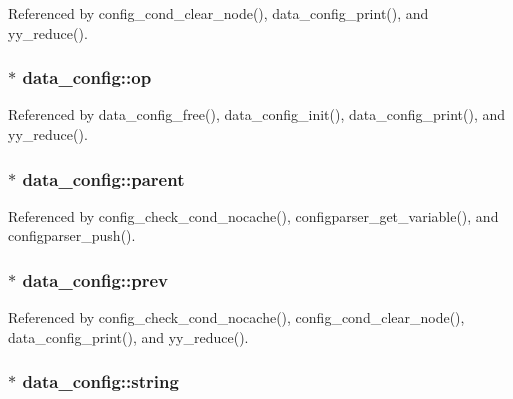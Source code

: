 Referenced by config\-\_\-cond\-\_\-clear\-\_\-node(), data\-\_\-config\-\_\-print(), and yy\-\_\-reduce().

\hypertarget{structdata__config_a16bbe4b9c4da475f530a55cad682508d}{
\subsubsection[{op}]{$\ast$ data\-\_\-config\-::op}}\label{structdata__config_a16bbe4b9c4da475f530a55cad682508d}


Referenced by data\-\_\-config\-\_\-free(), data\-\_\-config\-\_\-init(), data\-\_\-config\-\_\-print(), and yy\-\_\-reduce().

\hypertarget{structdata__config_a673869c2a2837fdde35d7ce85ef2165f}{
\subsubsection[{parent}]{$\ast$ data\-\_\-config\-::parent}}\label{structdata__config_a673869c2a2837fdde35d7ce85ef2165f}


Referenced by config\-\_\-check\-\_\-cond\-\_\-nocache(), configparser\-\_\-get\-\_\-variable(), and configparser\-\_\-push().

\hypertarget{structdata__config_a521a2a5a29d23447ad150324c9705128}{
\subsubsection[{prev}]{$\ast$ data\-\_\-config\-::prev}}\label{structdata__config_a521a2a5a29d23447ad150324c9705128}


Referenced by config\-\_\-check\-\_\-cond\-\_\-nocache(), config\-\_\-cond\-\_\-clear\-\_\-node(), data\-\_\-config\-\_\-print(), and yy\-\_\-reduce().

\hypertarget{structdata__config_a6198a6b7dc4dd6ed678be1571890e152}{
\subsubsection[{string}]{$\ast$ data\-\_\-config\-::string}}\label{structdata__config_a6198a6b7dc4dd6ed678be1571890e152}


